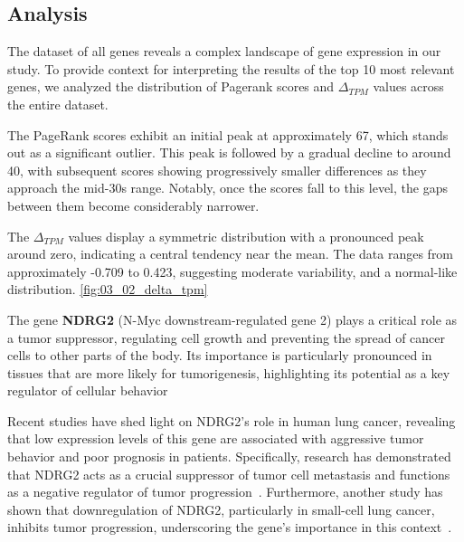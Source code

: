 \subsection{Analysis} \label{subsec:analysis}

The dataset of all genes reveals a complex landscape of gene expression in our study.
To provide context for interpreting the results of the top 10 most relevant genes,
we analyzed the distribution of Pagerank scores and $\Delta_{TPM}$ values across the entire dataset.

The PageRank scores exhibit an initial peak at approximately 67, which stands out as a significant outlier.
This peak is followed by a gradual decline to around 40, with subsequent scores showing progressively smaller differences
as they approach the mid-30s range.
Notably, once the scores fall to this level, the gaps between them become considerably narrower.

The $\Delta_{TPM}$ values display a symmetric distribution with a pronounced peak around zero, indicating a central tendency near the mean.
The data ranges from approximately -0.709 to 0.423, suggesting moderate variability, and a normal-like distribution.
\ref{fig:03_02_delta_tpm}
\newline


The gene \textbf{NDRG2} (N-Myc downstream-regulated gene 2) plays a critical role as a tumor suppressor,
regulating cell growth and preventing the spread of cancer cells to other parts of the body.
Its importance is particularly pronounced in tissues that are more likely for tumorigenesis,
highlighting its potential as a key regulator of cellular behavior~\cite{Lee2022NDRG2}

Recent studies have shed light on NDRG2's role in human lung cancer,
revealing that low expression levels of this gene are associated with aggressive tumor behavior and poor prognosis in patients.
Specifically, research has demonstrated that NDRG2 acts as a crucial suppressor of tumor cell metastasis and
functions as a negative regulator of tumor progression~\cite{Li2013NDRG2}.
Furthermore, another study has shown that downregulation of NDRG2, particularly in small-cell lung cancer,
inhibits tumor progression, underscoring the gene's importance in this context~\cite{Ma2024NDRG2}.

